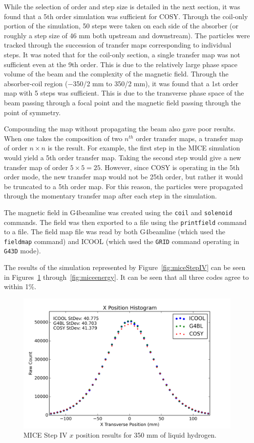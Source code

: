 While the selection of order and step size is detailed in the next section, it was found that a 5th order simulation was sufficient for COSY. Through the coil-only portion of the simulation, 50 steps were taken on each side of the absorber (or roughly a step size of 46 mm both upstream and downstream). The particles were tracked through the succession of transfer maps corresponding to individual steps. It was noted that for the coil-only section, a single transfer map was not sufficient even at the 9th order. This is due to the relatively large phase space volume of the beam and the complexity of the magnetic field. Through the absorber-coil region ($-$350/2 mm to 350/2 mm), it was found that a 1st order map with 5 steps was sufficient. This is due to the transverse phase space of the beam passing through a focal point and the magnetic field passing through the point of symmetry.

Compounding the map without propagating the beam also gave poor results. When one takes the composition of two $n^{th}$ order transfer maps, a transfer map of order $n\times n$ is the result. For example, the first step in the MICE simulation would yield a 5th order transfer map. Taking the second step would give a new transfer map of order $5\times 5 = 25$. However, since COSY is operating in the 5th order mode, the new transfer map would not be 25th order, but rather it would be truncated to a 5th order map. For this reason, the particles were propagated through the momentary transfer map after each step in the simulation.

The magnetic field in G4beamline was created using the \texttt{coil} and \texttt{solenoid} commands. The field was then exported to a file using the \texttt{printfield} command to a file. The field map file was read by both G4beamline (which used the \texttt{fieldmap} command) and ICOOL (which used the \texttt{GRID} command operating in \texttt{G43D} mode).

The results of the simulation represented by Figure~\ref{fig:miceStepIV} can be seen in Figures~\ref{fig:micex} through~\ref{fig:miceenergy}. It can be seen that all three codes agree to within 1\%.

\begin{figure}[H]
  \centering
    \includegraphics[width=\textwidth]{MICE data/x} 
  \caption{MICE Step IV $x$ position results for 350 mm of liquid hydrogen.}
  \label{fig:micex}
\end{figure}

